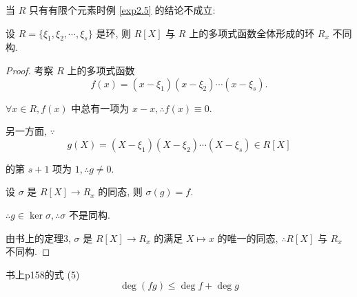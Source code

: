 \documentclass[color=black,device=normal,lang=cn,mode=geye]{elegantnote}
\begin{document}
当 $R$ 只有有限个元素时例 \ref{exp2.5} 的结论不成立:
\begin{example}
    设 $R=\{\xi_1,\xi_2,\cdots,\xi_s\}$ 是环, 则 $R[X]$ 与 $R$ 上的多项式函数全体形成的环 $R_x$ 不同构.
\end{example}
\begin{proof}
    考察 $R$ 上的多项式函数
    \[f(x)=(x-\xi_1)(x-\xi_2)\cdots(x-\xi_s).\]

    $\forall x\in R,f(x)$ 中总有一项为 $x-x,\therefore f(x)\equiv0$.

    另一方面, $\because$
    \[g(X)=(X-\xi_1)(X-\xi_2)\cdots(X-\xi_s)\in R[X]\]

    的第 $s+1$ 项为 $1,\therefore g\neq0$.

    设 $\sigma$ 是 $R[X]\to R_x$ 的同态, 则 $\sigma(g)=f$.
    
    $\therefore g\in\ker\sigma,\therefore\sigma$ 不是同构.

    由书上的定理3, $\sigma$ 是 $R[X]\to R_x$ 的满足 $X\mapsto x$ 的唯一的同态, $\therefore R[X]$ 与 $R_x$ 不同构.
\end{proof}
书上p158的式 (5)
\[\deg(fg)\leq\deg f+\deg g\]
\end{document}

